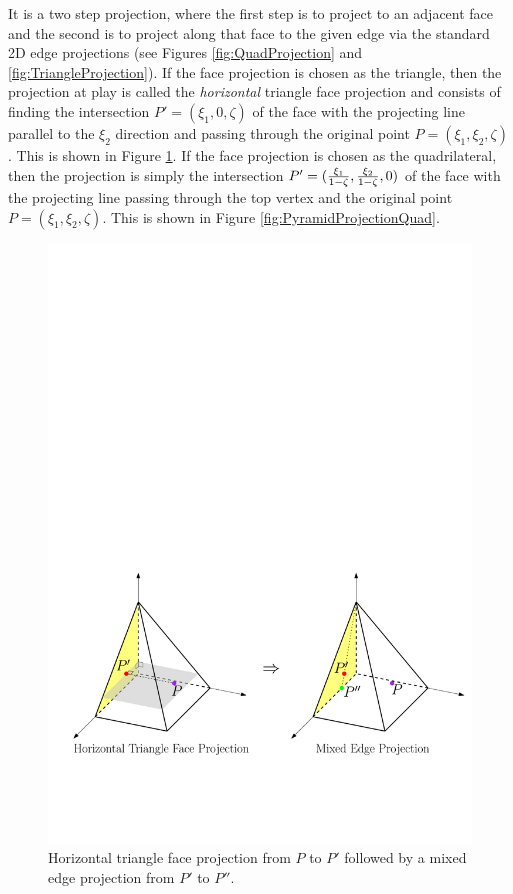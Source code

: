 It is a two step projection, where the first step is to project to an adjacent face and the second is to project along that face to the given edge via the standard 2D edge projections (see Figures \ref{fig:QuadProjection} and \ref{fig:TriangleProjection}).
If the face projection is chosen as the triangle, then the projection at play is called the \textit{horizontal} triangle face projection and consists of finding the intersection $P'=(\xi_1,0,\zeta)$ of the face with the projecting line parallel to the $\xi_2$ direction and passing through the original point $P=(\xi_1,\xi_2,\zeta)$. 
This is shown in Figure \ref{fig:PyramidProjectionHorizontalTriangle}.
If the face projection is chosen as the quadrilateral, then the projection is simply the intersection $P'=(\textstyle{\frac{\xi_1}{1-\zeta}},\textstyle{\frac{\xi_2}{1-\zeta}},0)$ of the face with the projecting line passing through the top vertex and the original point $P=(\xi_1,\xi_2,\zeta)$. 
This is shown in Figure \ref{fig:PyramidProjectionQuad}.

\begin{figure}[!ht]
\begin{center}
\includegraphics[scale=0.6]{./figures/PyramidProjectionHorizontalTriangle.pdf}
\caption{Horizontal triangle face projection from $P$ to $P'$ followed by a mixed edge projection from $P'$ to $P''$.}
\label{fig:PyramidProjectionHorizontalTriangle}
\end{center}
\end{figure}


